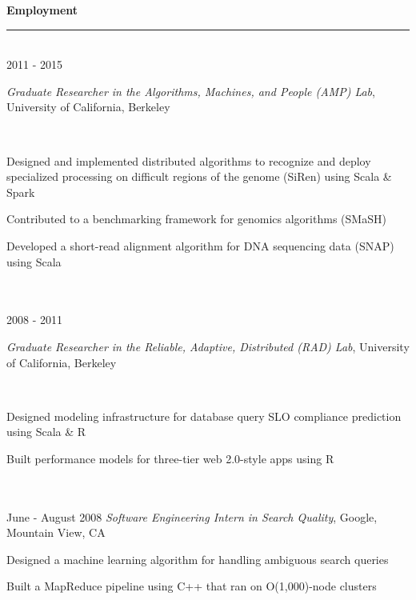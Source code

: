 \documentclass[11pt]{article}
\newcommand{\parwidth}{5.3 in}
\newcommand{\tabwidth}{1.5 in}
\newcommand{\head}[1]{
{\bf #1} \\
\rule{\textwidth}{0.01 in}

\vspace{-0.35 in}

}
\begin{document}

\head{Employment}

\begin{tabbing}
\hspace{\tabwidth} \= \\ 
2011 - 2015 \> \parbox[t]{\parwidth}{\textit{Graduate Researcher in the Algorithms, Machines, and People (AMP) Lab}, University of California, Berkeley}\\
\> \parbox[t]{\parwidth}{
\begin{compactitem}
\item Designed and implemented distributed algorithms to recognize and deploy specialized processing on difficult regions of the genome (SiRen) using Scala \& Spark
\item Contributed to a benchmarking framework for genomics algorithms (SMaSH)
\item Developed a short-read alignment algorithm for DNA sequencing data (SNAP) using Scala
\end{compactitem}
} \\

\hspace{\tabwidth} \= \\ 
2008 - 2011 \> \parbox[t]{\parwidth}{\textit{Graduate Researcher in the Reliable, Adaptive, Distributed (RAD) Lab}, University of California, Berkeley}\\
\> \parbox[t]{\parwidth}{
\begin{compactitem}
\item Designed modeling infrastructure for database query SLO compliance prediction using Scala \& R
\item Built performance models for three-tier web 2.0-style apps using R
\end{compactitem}
}\\

\hspace{\tabwidth} \= \\ 
June - August 2008 \> \emph{Software Engineering Intern in Search Quality}, Google, Mountain View, CA \\ 
\> \parbox[t]{\parwidth}{
\begin{compactitem}
\item Designed a machine learning algorithm for handling ambiguous search queries
\item Built a MapReduce pipeline using C++ that ran on O(1,000)-node clusters
\end{compactitem}
}\\


\end{tabbing}
\end{document}

